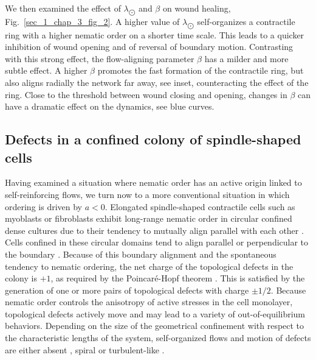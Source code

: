 \documentclass[12pt]{iopart}
\begin{document}
	
	We then examined the effect of $\lambda_{\bigodot}$ and $\beta$ on wound healing,  Fig.~\ref{sec_1_chap_3_fig_2}. A higher value of $\lambda_{\bigodot}$ self-organizes a contractile ring with a higher nematic order on a shorter time scale. This leads to a quicker inhibition of  wound opening and of  reversal of  boundary motion. Contrasting with this strong effect, the flow-aligning parameter $\beta$ has a milder and more subtle effect. A higher $\beta$ promotes the fast formation of the contractile ring, but also aligns radially the network far away, see inset, counteracting the effect of the ring. Close to the threshold between wound closing and opening, changes in $\beta$ can have a dramatic effect on the dynamics, see blue curves.
	
	
	\subsection{Defects in a confined colony of spindle-shaped cells}
	\label{ex2}
	
	Having examined a situation where nematic order has an active origin linked to self-reinforcing flows, we turn now to a more conventional situation in which ordering is driven by $a<0$. Elongated spindle-shaped contractile cells such as myoblasts or fibroblasts exhibit long-range nematic order in circular confined dense cultures \cite{duclos2014,guillamat2020} due to their tendency to mutually align parallel with each other \cite{elsdale1968}. Cells confined in these circular domains tend to align parallel or perpendicular to the boundary \cite{guillamat2020}.
	Because of this boundary alignment and the spontaneous tendency to nematic ordering, the net charge of the topological defects in the colony is $+1$, as required by the Poincar\'{e}-Hopf theorem \cite{jubin2009}. This is satisfied by the generation of one or more pairs of topological defects with charge $\pm 1/2$.
	Because nematic order controls the anisotropy of active stresses in the cell monolayer, topological defects actively move and may lead to a variety of out-of-equilibrium behaviors. 
	Depending on the size of the geometrical confinement with respect to the characteristic lengths of the system, self-organized flows and motion of defects are either absent \cite{duclos2014}, spiral or turbulent-like \cite{norton2018}. 
	
\end{document}
